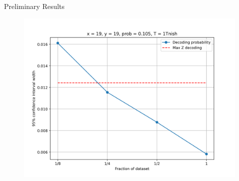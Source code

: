 \documentclass{dfki}
\begin{document}
\begin{frame}{Preliminary Results}
	\begin{figure}
		\centering
		\includegraphics[width=0.5\linewidth]{fig/CIwidth.png}
	\end{figure}
\end{frame}
\end{document}
